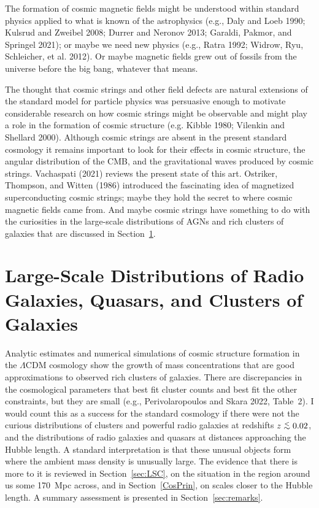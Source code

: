 \documentclass[fleqn,12pt]{article}
\def\lap{\lower.5ex\hbox{$\; \buildrel < \over \sim \;$}}
\begin{document}
The formation of cosmic magnetic fields might be understood within standard physics applied to what is known of the astrophysics (e.g., Daly and Loeb 1990; Kulsrud and Zweibel 2008; Durrer and  Neronov 2013; Garaldi, Pakmor, and Springel 2021); or maybe we need new physics (e.g., Ratra 1992; Widrow, Ryu, Schleicher, et al. 2012). Or maybe magnetic fields grew out of fossils from the universe before the big bang, whatever that means.

The thought that cosmic strings and other field defects are natural extensions of the standard model for particle physics was persuasive enough to motivate considerable research on how cosmic strings might be observable and might play a role in the formation of cosmic structure (e.g. Kibble 1980; Vilenkin and Shellard 2000). Although  cosmic strings are absent in the present standard cosmology it remains important to look for their effects in cosmic structure, the angular distribution of the CMB, and the gravitational waves produced by cosmic strings. Vachaspati (2021) reviews the present state of this art. Ostriker, Thompson, and Witten (1986) introduced the fascinating idea of magnetized superconducting cosmic strings; maybe they hold the secret to where cosmic magnetic fields came from.  And maybe cosmic strings have something to do with the curiosities in the large-scale distributions of AGNs and rich clusters of galaxies that are discussed in Section~\ref{sec:distributions}. 

\section{Large-Scale Distributions of Radio Galaxies, Quasars, and Clusters of Galaxies}\label{sec:distributions}

Analytic estimates and numerical simulations of cosmic structure formation in the $\Lambda$CDM cosmology show the growth of mass concentrations that are good approximations to observed rich clusters of galaxies. There are discrepancies in the cosmological parameters that best fit cluster counts and best fit the other constraints, but they are small (e.g., Perivolaropoulos and Skara 2022, Table~2). I would count this as a success for the standard cosmology if there were not the curious distributions of clusters and powerful radio galaxies at redshifts $z\lap 0.02$, and the distributions of radio galaxies and quasars at distances approaching the Hubble length. A standard interpretation is that these unusual objects form where the ambient mass density is unusually large. The evidence that there is more to it is reviewed in Section~\ref{sec:LSC}, on the situation in the region around us some 170~Mpc across, and in Section~\ref{CosPrin}, on scales closer to the Hubble length. A summary assessment is presented in Section~\ref{sec:remarks}. 
\end{document}

